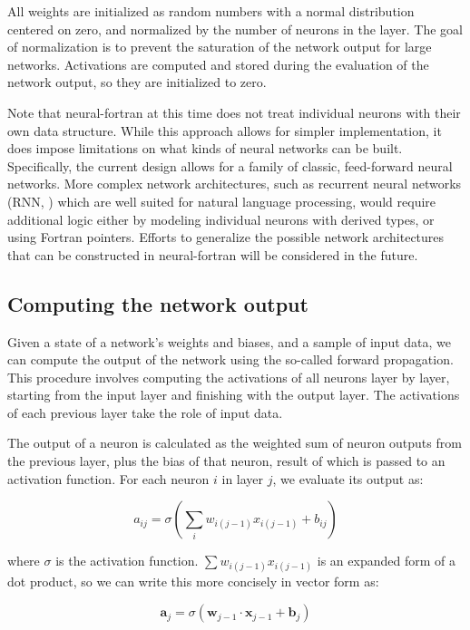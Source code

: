 \documentclass[sigplan, review=false, screen=true, balance=true]{acmart}
\begin{document}
All weights are initialized as random numbers with a normal distribution
centered on zero, and normalized by the number of neurons in the layer. The
goal of normalization is to prevent the saturation of the network output
for large networks.
Activations are computed and stored during the evaluation of the network output,
so they are initialized to zero.

Note that neural-fortran at this time does not treat individual neurons
with their own data structure. While this approach allows for simpler
implementation, it does impose limitations on what kinds of neural networks
can be built. Specifically, the current design allows for a family of classic,
feed-forward neural networks. More complex network architectures, such
as recurrent neural networks (RNN, \cite{hochreiter97}) which are well suited
for natural language processing, would require additional logic either by
modeling individual neurons with derived types, or using Fortran pointers.
Efforts to generalize the possible network architectures that can be constructed
in neural-fortran will be considered in the future.

\subsection{Computing the network output}

Given a state of a network's weights and biases, and a sample of input data,
we can compute the output of the network using the so-called forward propagation.
This procedure involves computing the activations of all neurons layer by layer,
starting from the input layer and finishing with the output layer. The
activations of each previous layer take the role of input data.

The output of a neuron is calculated as the weighted sum of neuron outputs
from the previous layer, plus the bias of that neuron, result of which is passed
to an activation function. For each neuron $i$ in layer $j$, we evaluate its
output as:

\begin{equation}
  \label{eq:activation}
  a_{ij} = \sigma \left( \sum_i w_{i(j-1)} x_{i(j-1)} + b_{ij} \right)
\end{equation}

where $\sigma$ is the activation function.
$\sum w_{i(j-1)} x_{i(j-1)}$ is an expanded form of a dot product,
so we can write this more concisely in vector form as:

\begin{equation}
  \label{eq:activation_vector}
  \mathbf{a}_j = \sigma \left( \mathbf{w}_{j-1} \cdot \mathbf{x}_{j-1} + \mathbf{b}_j \right)
\end{equation}
\end{document}
